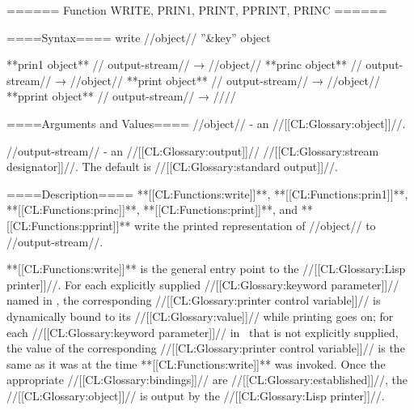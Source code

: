 ====== Function WRITE, PRIN1, PRINT, PPRINT, PRINC ======

====Syntax====
\DefunWithValuesNewline write {//object// ''&key'' } {object}

**prin1 {object** //\opt} output-stream// → //object// **princ {object** //\opt} output-stream// → //object// **print {object** //\opt} output-stream// → //object// **pprint {object** //\opt} output-stream// → //\novalues//

====Arguments and Values====
//object// - an //[[CL:Glossary:object]]//.

//output-stream// - an //[[CL:Glossary:output]]// //[[CL:Glossary:stream designator]]//. The default is //[[CL:Glossary:standard output]]//.


====Description====
**[[CL:Functions:write]]**, **[[CL:Functions:prin1]]**, **[[CL:Functions:princ]]**, **[[CL:Functions:print]]**, and **[[CL:Functions:pprint]]** write the printed representation of //object// to //output-stream//.

**[[CL:Functions:write]]** is the general entry point to the //[[CL:Glossary:Lisp printer]]//. For each explicitly supplied //[[CL:Glossary:keyword parameter]]// named in \thenextfigure, the corresponding //[[CL:Glossary:printer control variable]]// is dynamically bound to its //[[CL:Glossary:value]]// while printing goes on; for each //[[CL:Glossary:keyword parameter]]// in \thenextfigure\ that is not explicitly supplied, the value of the corresponding //[[CL:Glossary:printer control variable]]// is the same as it was at the time **[[CL:Functions:write]]** was invoked. Once the appropriate //[[CL:Glossary:bindings]]// are //[[CL:Glossary:established]]//, the //[[CL:Glossary:object]]// is output by the //[[CL:Glossary:Lisp printer]]//.


